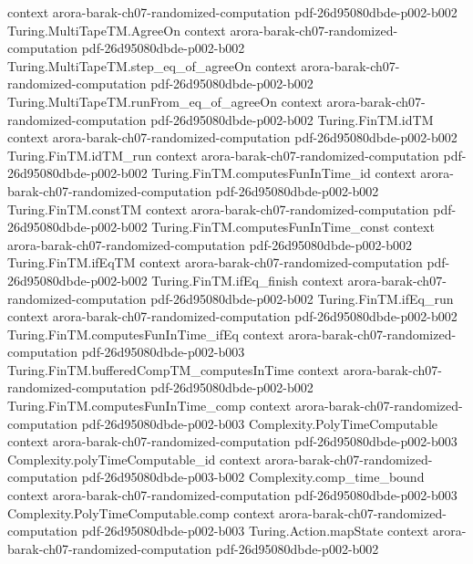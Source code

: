 \begin{theorem}
  {context}
  {arora-barak-ch07-randomized-computation}
  {pdf-26d95080dbde-p002-b002}
\proofstep
  {Turing.MultiTapeTM.AgreeOn}
  {context}
  {arora-barak-ch07-randomized-computation}
  {pdf-26d95080dbde-p002-b002}
\proofstep
  {Turing.MultiTapeTM.step_eq_of_agreeOn}
  {context}
  {arora-barak-ch07-randomized-computation}
  {pdf-26d95080dbde-p002-b002}
\proofstep
  {Turing.MultiTapeTM.runFrom_eq_of_agreeOn}
  {context}
  {arora-barak-ch07-randomized-computation}
  {pdf-26d95080dbde-p002-b002}
\proofstep
  {Turing.FinTM.idTM}
  {context}
  {arora-barak-ch07-randomized-computation}
  {pdf-26d95080dbde-p002-b002}
\proofstep
  {Turing.FinTM.idTM_run}
  {context}
  {arora-barak-ch07-randomized-computation}
  {pdf-26d95080dbde-p002-b002}
\proofstep
  {Turing.FinTM.computesFunInTime_id}
  {context}
  {arora-barak-ch07-randomized-computation}
  {pdf-26d95080dbde-p002-b002}
\proofstep
  {Turing.FinTM.constTM}
  {context}
  {arora-barak-ch07-randomized-computation}
  {pdf-26d95080dbde-p002-b002}
\proofstep
  {Turing.FinTM.computesFunInTime_const}
  {context}
  {arora-barak-ch07-randomized-computation}
  {pdf-26d95080dbde-p002-b002}
\proofstep
  {Turing.FinTM.ifEqTM}
  {context}
  {arora-barak-ch07-randomized-computation}
  {pdf-26d95080dbde-p002-b002}
\proofstep
  {Turing.FinTM.ifEq_finish}
  {context}
  {arora-barak-ch07-randomized-computation}
  {pdf-26d95080dbde-p002-b002}
\proofstep
  {Turing.FinTM.ifEq_run}
  {context}
  {arora-barak-ch07-randomized-computation}
  {pdf-26d95080dbde-p002-b002}
\proofstep
  {Turing.FinTM.computesFunInTime_ifEq}
  {context}
  {arora-barak-ch07-randomized-computation}
  {pdf-26d95080dbde-p002-b003}
\proofstep
  {Turing.FinTM.bufferedCompTM_computesInTime}
  {context}
  {arora-barak-ch07-randomized-computation}
  {pdf-26d95080dbde-p002-b002}
\proofstep
  {Turing.FinTM.computesFunInTime_comp}
  {context}
  {arora-barak-ch07-randomized-computation}
  {pdf-26d95080dbde-p002-b003}
\proofstep
  {Complexity.PolyTimeComputable}
  {context}
  {arora-barak-ch07-randomized-computation}
  {pdf-26d95080dbde-p002-b003}
\proofstep
  {Complexity.polyTimeComputable_id}
  {context}
  {arora-barak-ch07-randomized-computation}
  {pdf-26d95080dbde-p003-b002}
\proofstep
  {Complexity.comp_time_bound}
  {context}
  {arora-barak-ch07-randomized-computation}
  {pdf-26d95080dbde-p002-b003}
\proofstep
  {Complexity.PolyTimeComputable.comp}
  {context}
  {arora-barak-ch07-randomized-computation}
  {pdf-26d95080dbde-p002-b003}
\proofstep
  {Turing.Action.mapState}
  {context}
  {arora-barak-ch07-randomized-computation}
  {pdf-26d95080dbde-p002-b002}
\proofstep

\end{theorem}
